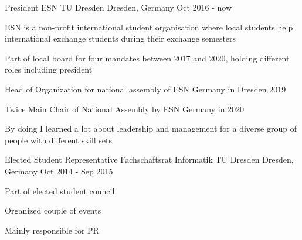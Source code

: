 \begin{cventries}

	\cventry
	{President} %
	{ESN TU Dresden} %
	{Dresden, Germany} %
	{Oct 2016 - now} %
	{
		\begin{cvitems} %
			\item{ESN is a non-profit international student organisation where local students help international exchange students during their exchange semesters}
			\item{Part of local board for four mandates between 2017 and 2020, holding different roles including president}
			\item{Head of Organization for national assembly of ESN Germany in Dresden 2019}
			\item{Twice Main Chair of National Assembly by ESN Germany in 2020}
			\item { By doing I learned a lot about leadership and management for a diverse group of people with different skill sets}
		\end{cvitems}
	}


	\cventry
	{Elected Student Representative} %
	{Fachschaftsrat Informatik TU Dresden} %
	{Dresden, Germany} %
	{Oct 2014 - Sep 2015} %
	{
		\begin{cvitems} %
			\item{Part of elected student council}
			\item{Organized couple of events}
			\item{Mainly responsible for PR}
		\end{cvitems}
	}
\end{cventries}
